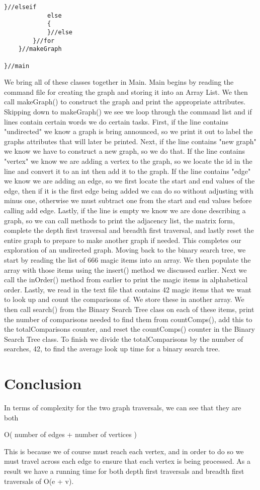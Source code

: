 \documentclass{article}
\begin{document}
\begin{lstlisting}[frame =single,
backgroundcolor = \color{grey!12}]
			}//elseif
			else
			{
			}//else
		}//for
	}//makeGraph
	
}//main
\end{lstlisting}
\large
We bring all of these classes together in Main. Main begins by reading the command file for creating the graph and storing it into an Array List. We then call makeGraph() to construct the graph and print the appropriate attributes. Skipping down to makeGraph() we see we loop through the command list and if lines contain certain words we do certain tasks. First, if the line contains "undirected" we know a graph is bring announced, so we print it out to label the graphs attributes that will later be printed. Next, if the line contains "new graph" we know we have to construct a new graph, so we do that. If the line contains "vertex" we know we are adding a vertex to the graph, so we locate the id in the line and convert it to an int then add it to the graph. If the line contains "edge" we know we are adding an edge, so we first locate the start and end values of the edge, then if it is the first edge being added we can do so without adjusting with minus one, otherwise we must subtract one from the start and end values before calling add edge. Lastly, if the line is empty we know we are done describing a graph, so we can call methods to print the adjacency list, the matrix form, complete the depth first traversal and breadth first traversal, and lastly reset the entire graph to prepare to make another graph if needed. This completes our exploration of an undirected graph. Moving back to the binary search tree, we start by reading the list of 666 magic items into an array. We then populate the array with those items using the insert() method we discussed earlier. Next we call the inOrder() method from earlier to print the magic items in alphabetical order. Lastly, we read in the text file that contains 42 magic items that we want to look up and count the comparisons of. We store these in another array. We then call search() from the Binary Search Tree class on each of these items, print the number of comparisons needed to find them from countComps(), add this to the totalComparisons counter, and reset the countComps() counter in the Binary Search Tree class. To finish we divide the totalComparisons by the number of searches, 42, to find the average look up time for a binary search tree.  

\large
\section{Conclusion}
In terms of complexity for the two graph traversals, we can see that they are both
\begin{center}
 O( number of edges + number of vertices )
\end{center}
This is because we of course must reach each vertex, and in order to do so we must travel across each edge to ensure that each vertex is being processed. As a result we have a running time for both depth first traversals and breadth first traversals of O(e + v). 
\end{document}
